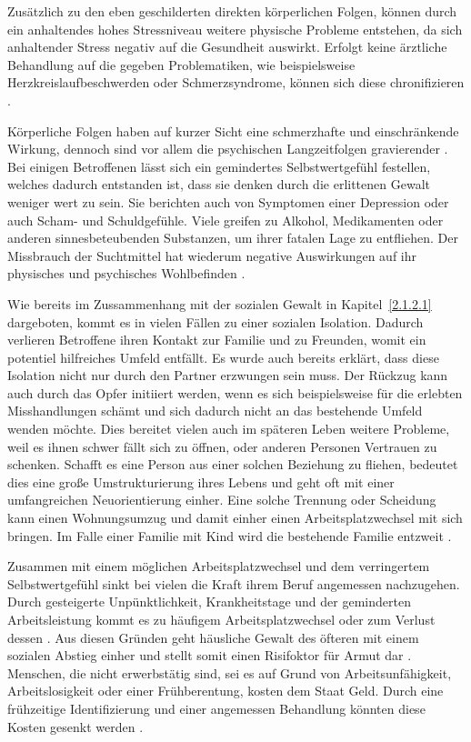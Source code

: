 Zusätzlich zu den eben geschilderten direkten körperlichen Folgen, können durch ein anhaltendes hohes Stressniveau weitere physische Probleme entstehen, da sich anhaltender Stress negativ auf die Gesundheit auswirkt. Erfolgt keine ärztliche Behandlung auf die gegeben Problematiken, wie beispielsweise Herzkreislaufbeschwerden oder Schmerzsyndrome, können sich diese chronifizieren \parencite{Gewaltart}.

Körperliche Folgen haben auf kurzer Sicht eine schmerzhafte und einschränkende Wirkung, dennoch sind vor allem die psychischen Langzeitfolgen gravierender \parencite{Def_haus_Gewalt_2, Def_Form_Folge_Gewalt}. Bei einigen Betroffenen lässt sich ein gemindertes Selbstwertgefühl festellen, welches dadurch entstanden ist, dass sie denken durch die erlittenen Gewalt weniger wert zu sein. Sie berichten auch von Symptomen einer Depression oder auch Scham- und Schuldgefühle. Viele greifen zu Alkohol, Medikamenten oder anderen sinnesbeteubenden Substanzen, um ihrer fatalen Lage zu entfliehen. Der Missbrauch der Suchtmittel hat wiederum negative Auswirkungen auf ihr physisches und psychisches Wohlbefinden \parencite{Def_haus_Gewalt_2, Gewaltart}.

Wie bereits im Zussammenhang mit der sozialen Gewalt in Kapitel~\ref{2.1.2.1} dargeboten, kommt es in vielen Fällen zu einer sozialen Isolation. Dadurch verlieren Betroffene ihren Kontakt zur Familie und zu Freunden, womit ein potentiel hilfreiches Umfeld entfällt. Es wurde auch bereits erklärt, dass diese Isolation nicht nur durch den Partner erzwungen sein muss. Der Rückzug kann auch durch das Opfer initiiert werden, wenn es sich beispielsweise für die erlebten Misshandlungen schämt und sich dadurch nicht an das bestehende Umfeld wenden möchte. Dies bereitet vielen auch im späteren Leben weitere Probleme, weil es ihnen schwer fällt sich zu öffnen, oder anderen Personen Vertrauen zu schenken. Schafft es eine Person aus einer solchen Beziehung zu fliehen, bedeutet dies eine große Umstrukturierung ihres Lebens und geht oft mit einer umfangreichen Neuorientierung einher. Eine solche Trennung oder Scheidung kann einen Wohnungsumzug und damit einher einen Arbeitsplatzwechsel mit sich bringen. Im Falle einer Familie mit Kind wird die bestehende Familie entzweit \parencite{Gewaltart, Def_haus_Gewalt_2, Def_Form_Folge_Gewalt}.

Zusammen mit einem möglichen Arbeitsplatzwechsel und dem verringertem Selbstwertgefühl sinkt bei vielen die Kraft ihrem Beruf angemessen nachzugehen. Durch gesteigerte Unpünktlichkeit, Krankheitstage und der geminderten Arbeitsleistung kommt es zu häufigem Arbeitsplatzwechsel oder zum Verlust dessen \parencite{Def_haus_Gewalt, Def_haus_Gewalt_2, Def_Form_Folge_Gewalt, Gewaltart}. Aus diesen Gründen geht häusliche Gewalt des öfteren mit einem sozialen Abstieg einher und stellt somit einen Risifoktor für Armut dar \parencite{Def_haus_Gewalt_2, Gewaltart}. Menschen, die nicht erwerbstätig sind, sei es auf Grund von Arbeitsunfähigkeit, Arbeitslosigkeit oder einer Frühberentung, kosten dem Staat Geld. Durch eine frühzeitige Identifizierung und einer angemessen Behandlung könnten diese Kosten gesenkt werden \parencite{Def_haus_Gewalt, Def_Form_Folge_Gewalt}. 


